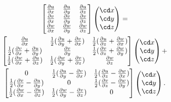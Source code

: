 \documentclass[a4paper,11pt]		{report}
\begin{document}
\begin{multline}
\begin{bmatrix}
 \frac{\partial u}{\partial x}&
 \frac{\partial u}{\partial y}&
 \frac{\partial u}{\partial z}\\
 \frac{\partial v}{\partial x}&
 \frac{\partial v}{\partial y}&
 \frac{\partial v}{\partial z}\\
 \frac{\partial w}{\partial x}&
 \frac{\partial w}{\partial y}&
 \frac{\partial w}{\partial z}\\
\end{bmatrix}
\begin{pmatrix}
\cd x \\ \cd y \\ \cd z
\end{pmatrix}
=\\
\begin{bmatrix}
 \frac{\partial u}{\partial x}&
 \frac{1}{2}(\frac{\partial u}{\partial y}+\frac{\partial v}{\partial x})&
 \frac{1}{2}(\frac{\partial u}{\partial z}+\frac{\partial w}{\partial x})\\
 \frac{1}{2}(\frac{\partial v}{\partial x}+\frac{\partial u}{\partial y})&
 \frac{\partial v}{\partial y}&
 \frac{1}{2}(\frac{\partial v}{\partial z}+\frac{\partial w}{\partial y})\\
 \frac{1}{2}(\frac{\partial w}{\partial x}+\frac{\partial u}{\partial z})&
 \frac{1}{2}(\frac{\partial w}{\partial y}+\frac{\partial v}{\partial z})&
 \frac{\partial w}{\partial z}\\
\end{bmatrix}
\begin{pmatrix}
\cd x \\ \cd y \\ \cd z
\end{pmatrix}
+\\
\begin{bmatrix}
 0 &
 \frac{1}{2}(\frac{\partial u}{\partial y}-\frac{\partial v}{\partial x})&
 \frac{1}{2}(\frac{\partial u}{\partial z}-\frac{\partial w}{\partial x})\\
 \frac{1}{2}(\frac{\partial v}{\partial x}-\frac{\partial u}{\partial y})&
 0 &
 \frac{1}{2}(\frac{\partial v}{\partial z}-\frac{\partial w}{\partial y})\\
 \frac{1}{2}(\frac{\partial w}{\partial x}-\frac{\partial u}{\partial z})&
 \frac{1}{2}(\frac{\partial w}{\partial y}-\frac{\partial v}{\partial z})&
 0\\
\end{bmatrix}
\begin{pmatrix}
\cd x \\ \cd y \\ \cd z
\end{pmatrix}.
\label{eq.decomp}
\end{multline}
\end{document}
